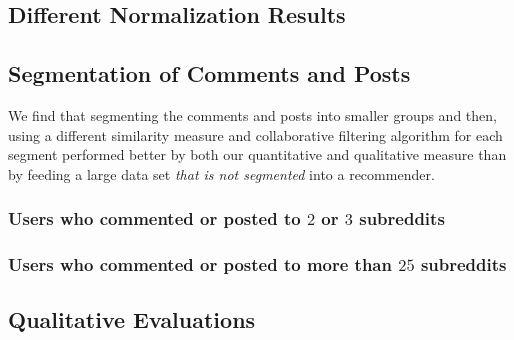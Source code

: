 \documentclass{article}
\begin{document}
\subsection{Different Normalization Results}\label{sec:different-normalization}

\subsection{Segmentation of Comments and Posts}\label{sec:set-com-posts}

We find that segmenting the comments and posts into smaller groups and then, using a different similarity measure
and collaborative filtering algorithm for each segment performed better by both our quantitative and qualitative
measure than by feeding a large data set \emph{that is not segmented} into a recommender.

\subsubsection{Users who commented or posted to $2$ or $3$ subreddits}\label{2-3-users}

\subsubsection{Users who commented or posted to more than $25$ subreddits}\label{more-than-25}

\subsection{Qualitative Evaluations}\label{sec:qualitative-evaluations}


\end{document}
